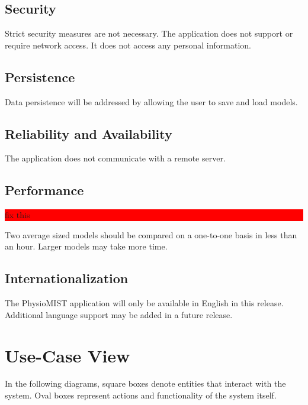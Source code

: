 \documentclass{article}
\newcommand{\todo}[1]{\colorbox{red}{\begin{minipage}{\textwidth}{#1}\end{minipage}}}
\begin{document}
\subsection{Security}
Strict security measures are not necessary. The application does not support or require network access. It does not access any personal information.
\subsection{Persistence}
Data persistence will be addressed by allowing the user to save and load models.
\subsection{Reliability and Availability}
The application does not communicate with a remote server.
\subsection{Performance}
\todo{fix this}
Two average sized models should be compared on a one-to-one basis in less than an hour.  Larger models may take more time.
\subsection{Internationalization}
The PhysioMIST application will only be available in English in this release. Additional language support may be added in a future release.

\section{Use-Case View}
In the following diagrams, square boxes denote entities that interact with the system.  Oval boxes represent actions and functionality of the system itself.
\end{document}
